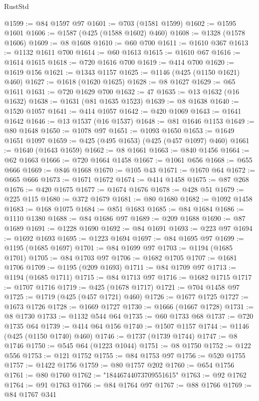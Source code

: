 \begin{lexlean}{RustStd}
\begin{coremodule}
{\begin{coremodule}
{{{{{{{{{{{{{{{{{{{{{{{{{{{{{{{{{{{{{{{{{{{{{{{{{{{{{@1599 := @84 @1597 @97
@1601 := @703 (@1581 @1599)
@1602 := @1595 @1601
@1606 := @1587 (@425 (@1588 @1602) @460)
@1608 := @1328 (@1578 @1606)
@1609 := @8 @1608
@1610 := @60 @700
@1611 := @1610 @367
@1613 := @1132 @1611 @700
@1614 := @60 @1613
@1615 := @1610 @67
@1616 := @1614 @1615
@1618 := @720 @1616 @700
@1619 := @414 @700
@1620 := @1619 @156
@1621 := @1343 @1157
@1625 := @1146 (@425 (@1150 @1621) @460)
@1627 := @1618 (@1620 @1625)
@1628 := @8 @1627
@1629 := @65 @1611
@1631 := @720 @1629 @700
@1632 := 47
@1635 := @13 @1632 (@16 @1632)
@1638 := @1631 (@81 @1635 @1523)
@1639 := @8 @1638
@1640 := @1520 @1057
@1641 := @414 @1057
@1642 := @420 @1069
@1643 := @1641 @1642
@1646 := @13 @1537 (@16 @1537)
@1648 := @81 @1646 @1153
@1649 := @80 @1648
@1650 := @1078 @97
@1651 := @1093 @1650
@1653 := @1649 @1651 @1097
@1659 := @425 (@495 @1653) (@425 (@457 @1097) @460)
@1661 := @1640 (@1643 @1659)
@1662 := @8 @1661
@1663 := @840 @1456
@1664 := @62 @1663
@1666 := @720 @1664 @1458
@1667 := @1061 @656
@1668 := @655 @666
@1669 := @846 @1668
@1670 := @105 @43
@1671 := @1670 @64
@1672 := @665 @666
@1673 := @1671 @1672
@1674 := @414 @1458
@1675 := @87 @268
@1676 := @420 @1675
@1677 := @1674 @1676
@1678 := @428 @51
@1679 := @225 @115
@1680 := @372 @1679
@1681 := @80 @1680
@1682 := @1092 @1458
@1683 := @168 @1075
@1684 := @851 @1683
@1685 := @84 @1684
@1686 := @1110 @1380
@1688 := @84 @1686 @97
@1689 := @209 @1688
@1690 := @87 @1689
@1691 := @1228 @1690
@1692 := @84 @1691
@1693 := @223 @97
@1694 := @1692 @1693
@1695 := @1223 @1694
@1697 := @84 @1695 @97
@1699 := @1195 (@1685 @1697)
@1701 := @84 @1699 @97
@1703 := @1194 (@1685 @1701)
@1705 := @84 @1703 @97
@1706 := @1682 @1705
@1707 := @1681 @1706
@1709 := @1195 (@209 @1693)
@1711 := @84 @1709 @97
@1713 := @1194 (@1685 @1711)
@1715 := @84 @1713 @97
@1716 := @1682 @1715
@1717 := @1707 @1716
@1719 := @425 (@1678 @1717)
@1721 := @704 @1458 @97
@1725 := @1719 (@425 (@457 @1721) @460)
@1726 := @1677 @1725
@1727 := @1673 @1726
@1728 := @1669 @1727
@1730 := @1666 (@1667 @1728)
@1731 := @8 @1730
@1733 := @1132 @544 @64
@1735 := @60 @1733 @68
@1737 := @720 @1735 @64
@1739 := @414 @64 @156
@1740 := @1507 @1157
@1744 := @1146 (@425 (@1150 @1740) @460)
@1746 := @1737 (@1739 @1744)
@1747 := @8 @1746
@1750 := @545 @64 (@1223 @1044)
@1751 := @8 @1750
@1752 := @122 @556
@1753 := @121 @1752
@1755 := @84 @1753 @97
@1756 := @520 @1755
@1757 := @1422 @1756
@1759 := @80 @1757 @202
@1760 := @654 @1756
@1761 := @80 @1760
@1762 := "18446744073709551615"
@1763 := @92 @1762
@1764 := @91 @1763
@1766 := @84 @1764 @97
@1767 := @88 @1766
@1769 := @84 @1767 @341
}}}}}}}}}}}}}}}}}}}}}}}}}}}}}}}}}}}}}}}}}}}}}}}}}}}}}
\end{coremodule}}
\end{coremodule}
\end{lexlean}
